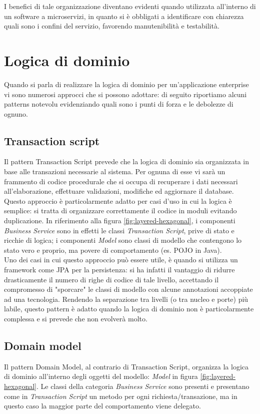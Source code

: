 I benefici di tale organizzazione diventano evidenti quando utilizzata all'interno di un software a microservizi, in quanto si è obbligati a identificare con chiarezza quali sono i confini del servizio, favorendo manutenibilità e testabilità.

\section{Logica di dominio}

Quando si parla di realizzare la logica di dominio per un'applicazione enterprise vi sono numerosi approcci che si possono adottare: di seguito riportiamo alcuni patterns  notevolu evidenziando quali sono i punti di forza e le debolezze di ognuno.

\subsection{Transaction script}
Il pattern Transaction Script\cite{enterprise_app} prevede che la logica di dominio sia organizzata in base alle transazioni necessarie al sistema.
Per ognuna di esse vi sarà un frammento di codice procedurale che si occupa di recuperare i dati necessari all'elaborazione, effettuare validazioni, modifiche ed aggiornare il database.
Questo approccio è particolarmente adatto per casi d'uso in cui la logica è semplice: si tratta di organizzare correttamente il codice in moduli evitando duplicazione.
In riferimento alla figura \ref{fig:layered-hexagonal}, i componenti \textit{Business Service} sono in effetti le classi \textit{Transaction Script}, prive di stato e ricchie di logica; i componenti \textit{Model} sono classi di modello che contengono lo stato vero e proprio, ma povere di comportamento (es. POJO in Java).\\
Uno dei casi in cui questo approccio può essere utile, è quando si utilizza un framework come JPA per la persistenza: si ha infatti il vantaggio di ridurre drasticamente il numero di righe di codice di tale livello, accettando il compromesso di "sporcare" le classi di modello con alcune annotazioni accoppiate ad una tecnologia.
Rendendo la separazione tra livelli (o tra nucleo e porte) più labile, questo pattern è adatto quando la logica di dominio non è particolarmente complessa e si prevede che non evolverà molto.

\subsection{Domain model}
Il pattern Domain Model\cite{enterprise_app}, al contrario di Transaction Script, organizza la logica di dominio all'interno degli oggetti del modello: \textit{Model} in figura \ref{fig:layered-hexagonal}.
Le classi della categoria \textit{Business Service} sono presenti e presentano come in \textit{Transaction Script} un metodo per ogni richiesta/transazione, ma in questo caso la maggior parte del comportamento viene delegato.

